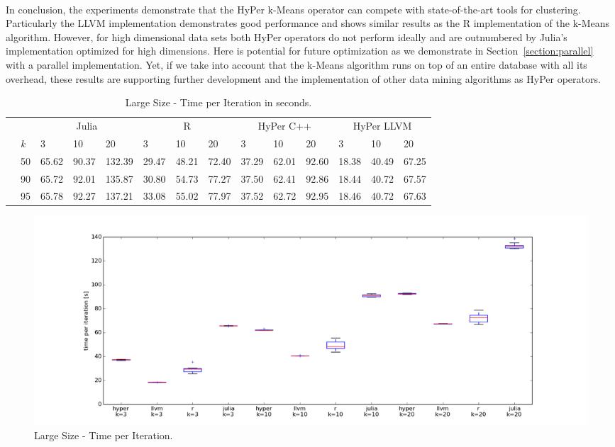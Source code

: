 \\
In conclusion, the experiments demonstrate that the HyPer k-Means operator can compete with state-of-the-art tools for clustering. Particularly the LLVM implementation demonstrates good performance and shows similar results as the R implementation of the k-Means algorithm. However, for high dimensional data sets both HyPer operators do not perform ideally and are outnumbered by Julia's implementation optimized for high dimensions. Here is potential for future optimization as we demonstrate in Section~\ref{section:parallel} with a parallel implementation. Yet, if we take into account that the k-Means algorithm runs on top of an entire database with all its overhead, these results are supporting further development and the implementation of other data mining algorithms as HyPer operators. 




\begin{table}[htsb]
  \caption[Large Size - Time per Iteration (Competitors)]{Large Size - Time per Iteration in seconds.}
  \label{tab:150M_all}
  \centering
  \begin{tabular}{l l l ll |l l l |l l l |l l l}
    \toprule
      && \multicolumn{3}{c}{Julia} & \multicolumn{3}{c}{R} & \multicolumn{3}{c}{HyPer C++} & \multicolumn{3}{c}{HyPer LLVM}  \\
      &\emph{k} & 3 & 10 & 20 & 3 & 10 & 20 & 3 & 10 & 20 & 3 & 10 & 20 \\
    \midrule
      \parbox[t]{2mm}{} &50  & 65.62 & 90.37 & 132.39 & 29.47 & 48.21 & 72.40 & 37.29 & 62.01 & 92.60 & 18.38 & 40.49 & 67.25 \\
      &90  & 65.72 & 92.01 & 135.87 & 30.80 & 54.73 & 77.27 & 37.50 & 62.41 & 92.86 & 18.44 & 40.72 & 67.57 \\
      &95  & 65.78 & 92.27 & 137.21 & 33.08 & 55.02 & 77.97 & 37.52 & 62.72 & 92.95 & 18.46 & 40.72 & 67.63 \\
    \bottomrule
  \end{tabular}
\end{table}


\begin{figure}[htsb]
  \centerline{
    \includegraphics[scale=0.4, trim="0cm 1cm 0cm 0cm"]{figures/charts/150M_all}
  }
  \caption[Large Size - Time per Iteration (Competitors)]{Large Size - Time per Iteration.}
  \label{fig:150M_all}
\end{figure}

